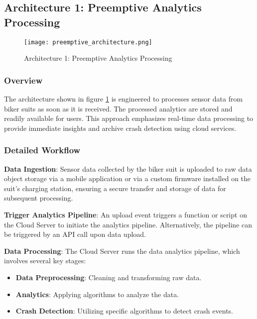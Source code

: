 \subsection{Architecture 1: Preemptive Analytics Processing}

\begin{figure}[htbp]
    \centering
    \texttt{[image: preemptive\_architecture.png]}
    \caption{Architecture 1: Preemptive Analytics Processing}
    \label{fig:preemptive_architecture}
\end{figure}

\subsubsection{Overview}
The architecture shown in figure \ref{fig:preemptive_architecture} is engineered to processes sensor data from biker suits as soon as it is received. The processed analytics are stored and readily available for users. This approach emphasizes real-time data processing to provide immediate insights and archive crash detection using cloud services. 

\subsubsection{Detailed Workflow}

\textbf{Data Ingestion}:  
Sensor data collected by the biker suit is uploaded to raw data object storage via a mobile application or via a custom firmware installed on the suit's charging station, ensuring a secure transfer and storage of data for subsequent processing.

\textbf{Trigger Analytics Pipeline}:  
An upload event triggers a function or script on the Cloud Server to initiate the analytics pipeline. Alternatively, the pipeline can be triggered by an API call upon data upload.

\textbf{Data Processing}:  
The Cloud Server runs the data analytics pipeline, which involves several key stages:
\begin{itemize}
    \item \textbf{Data Preprocessing}: Cleaning and transforming raw data.
    \item \textbf{Analytics}: Applying algorithms to analyze the data.
    \item \textbf{Crash Detection}: Utilizing specific algorithms to detect crash events.
\end{itemize}

